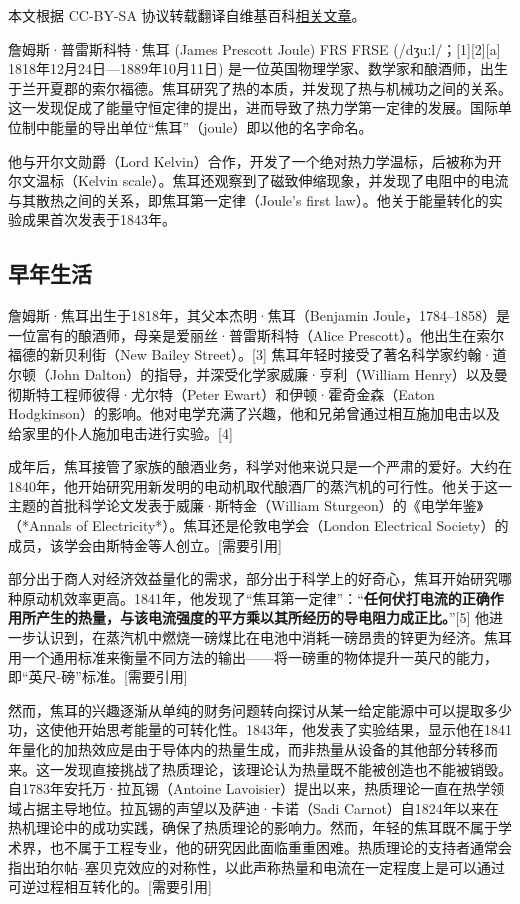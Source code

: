 
本文根据 CC-BY-SA 协议转载翻译自维基百科\href{https://en.wikipedia.org/wiki/James_Prescott_Joule}{相关文章}。


詹姆斯·普雷斯科特·焦耳 (James Prescott Joule) FRS FRSE (/dʒuːl/；[1][2][a] 1818年12月24日—1889年10月11日) 是一位英国物理学家、数学家和酿酒师，出生于兰开夏郡的索尔福德。焦耳研究了热的本质，并发现了热与机械功之间的关系。这一发现促成了能量守恒定律的提出，进而导致了热力学第一定律的发展。国际单位制中能量的导出单位“焦耳”（joule）即以他的名字命名。

他与开尔文勋爵（Lord Kelvin）合作，开发了一个绝对热力学温标，后被称为开尔文温标（Kelvin scale）。焦耳还观察到了磁致伸缩现象，并发现了电阻中的电流与其散热之间的关系，即焦耳第一定律（Joule's first law）。他关于能量转化的实验成果首次发表于1843年。

\subsection{早年生活} 
詹姆斯·焦耳出生于1818年，其父本杰明·焦耳（Benjamin Joule，1784–1858）是一位富有的酿酒师，母亲是爱丽丝·普雷斯科特（Alice Prescott）。他出生在索尔福德的新贝利街（New Bailey Street）。[3] 焦耳年轻时接受了著名科学家约翰·道尔顿（John Dalton）的指导，并深受化学家威廉·亨利（William Henry）以及曼彻斯特工程师彼得·尤尔特（Peter Ewart）和伊顿·霍奇金森（Eaton Hodgkinson）的影响。他对电学充满了兴趣，他和兄弟曾通过相互施加电击以及给家里的仆人施加电击进行实验。[4]  

成年后，焦耳接管了家族的酿酒业务，科学对他来说只是一个严肃的爱好。大约在1840年，他开始研究用新发明的电动机取代酿酒厂的蒸汽机的可行性。他关于这一主题的首批科学论文发表于威廉·斯特金（William Sturgeon）的《电学年鉴》（*Annals of Electricity*）。焦耳还是伦敦电学会（London Electrical Society）的成员，该学会由斯特金等人创立。[需要引用]  

部分出于商人对经济效益量化的需求，部分出于科学上的好奇心，焦耳开始研究哪种原动机效率更高。1841年，他发现了“焦耳第一定律”：“\textbf{任何伏打电流的正确作用所产生的热量，与该电流强度的平方乘以其所经历的导电阻力成正比。}”[5] 他进一步认识到，在蒸汽机中燃烧一磅煤比在电池中消耗一磅昂贵的锌更为经济。焦耳用一个通用标准来衡量不同方法的输出——将一磅重的物体提升一英尺的能力，即“英尺-磅”标准。[需要引用]  

然而，焦耳的兴趣逐渐从单纯的财务问题转向探讨从某一给定能源中可以提取多少功，这使他开始思考能量的可转化性。1843年，他发表了实验结果，显示他在1841年量化的加热效应是由于导体内的热量生成，而非热量从设备的其他部分转移而来。这一发现直接挑战了热质理论，该理论认为热量既不能被创造也不能被销毁。自1783年安托万·拉瓦锡（Antoine Lavoisier）提出以来，热质理论一直在热学领域占据主导地位。拉瓦锡的声望以及萨迪·卡诺（Sadi Carnot）自1824年以来在热机理论中的成功实践，确保了热质理论的影响力。然而，年轻的焦耳既不属于学术界，也不属于工程专业，他的研究因此面临重重困难。热质理论的支持者通常会指出珀尔帖–塞贝克效应的对称性，以此声称热量和电流在一定程度上是可以通过可逆过程相互转化的。[需要引用]  


